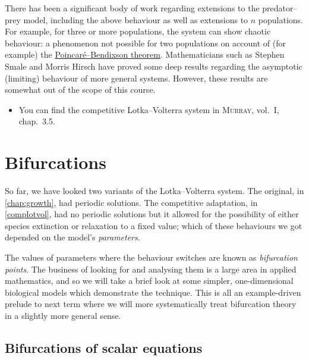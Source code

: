 \documentclass[main.tex]{subfiles}
\begin{document}
\begin{nem}
There has been a significant body of work regarding extensions to the predator--prey model, including the above behaviour as well as extensions to $n$ populations. For example, for three or more populations, the system can show chaotic behaviour: a phenomenon not possible for two populations on account of (for example) the \href{https://en.wikipedia.org/wiki/Poincar\%C3\%A9\%E2\%80\%93Bendixson_theorem}{Poincar\'e--Bendixson theorem}. Mathematicians such as Stephen Smale and Morris Hirsch have proved some deep results regarding the asymptotic (limiting) behaviour of more general systems. However, these results are somewhat out of the scope of this course.
\end{nem}

\begin{extra-reading}
\begin{itemize}
	\item You can find the competitive Lotka--Volterra system in \textsc{Murray}, vol.~I, chap.~3.5.
\end{itemize}
\end{extra-reading}



\chapter{Bifurcations}
\label{switching}

So far, we have looked two variants of the Lotka--Volterra system. The original, in \cref{chap:growth}, had periodic solutions. The competitive adaptation, in \cref{complotvol}, had no periodic solutions but it allowed for the possibility of either species extinction or relaxation to a fixed value; which of these behaviours we got depended on the model's \emph{parameters}. 

The values of parameters where the behaviour switches are known as \emph{bifurcation points}. The business of looking for and analysing them is a large area in applied mathematics, and so we will take a brief look at some simpler, one-dimensional biological models which demonstrate the technique. This is all an example-driven prelude to next term where we will more systematically treat bifurcation theory in a slightly more general sense.

\section{Bifurcations of scalar equations}
\end{document}
